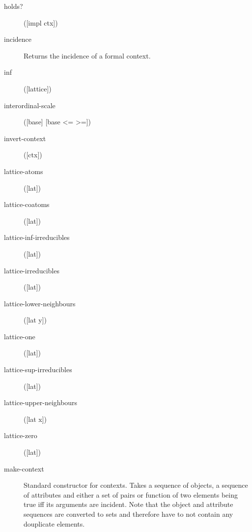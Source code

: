 \begin{description}
  \item[holds?]
([impl ctx])



  \item[incidence]


Returns the incidence of a formal context.

  \item[inf]
([lattice])



  \item[interordinal-scale]
([base] [base <= >=])



  \item[invert-context]
([ctx])



  \item[lattice-atoms]
([lat])



  \item[lattice-coatoms]
([lat])



  \item[lattice-inf-irreducibles]
([lat])



  \item[lattice-irreducibles]
([lat])



  \item[lattice-lower-neighbours]
([lat y])



  \item[lattice-one]
([lat])



  \item[lattice-sup-irreducibles]
([lat])



  \item[lattice-upper-neighbours]
([lat x])



  \item[lattice-zero]
([lat])



  \item[make-context]


Standard constructor for contexts. Takes a sequence of objects,
  a sequence of attributes and either a set of pairs or function of
  two elements being true iff its arguments are incident. Note that the
  object and attribute sequences are converted to sets and therefore have to
  not contain any douplicate elements.


\end{description}
